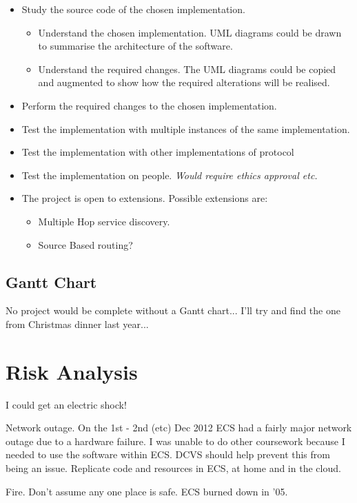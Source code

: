 \documentclass[12pt]{report}
\begin{document}
\begin{itemize}

\item Study the source code of the chosen implementation.

\begin{itemize}

\item Understand the chosen implementation.
UML diagrams could be drawn to summarise the architecture of the software. 

\item Understand the required changes.
The UML diagrams could be copied and augmented to show how the required
alterations will be realised. 

\end{itemize}

\item Perform the required changes to the chosen implementation.
\item Test the implementation with multiple instances of the same implementation.
\item Test the implementation with other implementations of protocol 
\item Test the implementation on people. \em Would require ethics approval etc. \em
{}
\item The project is open to extensions. Possible extensions are:

\begin{itemize}
\item Multiple Hop service discovery.
\item Source Based routing?
\end{itemize}

\end{itemize}

\section{Gantt Chart}
No project would be complete without a Gantt chart... I'll try and find the one
from Christmas dinner last year...


\chapter{Risk Analysis}

I could get an electric shock!

Network outage. On the 1st - 2nd (etc) Dec 2012 ECS had a fairly major network
outage due to a hardware failure. I was unable to do other coursework because I
needed to use the software within ECS. 
DCVS should help prevent this from being an issue. 
Replicate code and resources in ECS, at home and in the cloud. 

Fire. Don't assume any one place is safe. ECS burned down in '05.
\end{document}
